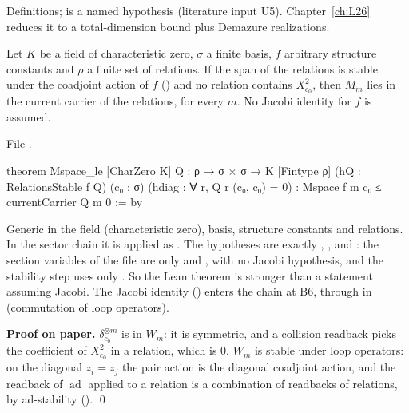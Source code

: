 \begin{status}
Definitions;  is a named hypothesis (literature input U5). Chapter~\ref{ch:L26} reduces it to a
total-dimension bound plus Demazure realizations.
\end{status}

\begin{theorem}[B5: $M_m\subseteq W_m$]\label{l24:thm:B5}
Let $K$ be a field of characteristic zero, $\sigma$ a finite basis, $f$ arbitrary structure constants and $\rho$ a
finite set of relations. If the span of the relations is stable under the coadjoint action of $f$
() and no relation contains $X_{c_0}^2$, then $M_m$ lies in the current carrier of the relations,
for every $m$. No Jacobi identity for $f$ is assumed.
\end{theorem}
\noindent File .
\begin{leancode}
theorem Mspace_le [CharZero K] {Q : ρ → σ × σ → K} [Fintype ρ] (hQ : RelationsStable f Q)
    (c₀ : σ) (hdiag : ∀ r, Q r (c₀, c₀) = 0) : Mspace f m c₀ ≤ currentCarrier Q m 0 := by
\end{leancode}

\begin{dictionary}
Generic in the field (characteristic zero), basis, structure constants and relations. In the sector chain it is
applied as . The hypotheses are exactly \lean{[CharZero K]},
\lean{[Fintype ρ]},  and : the section variables of the file are only
 and , with no Jacobi
hypothesis, and the stability step  uses only . So the Lean theorem is
stronger than a statement assuming Jacobi. The Jacobi identity () enters the chain at B6, through
 in  (commutation of loop operators).
\end{dictionary}

\textbf{Proof on paper.} $\delta_{c_0}^{\otimes m}$ is in $W_m$: it is symmetric, and a collision readback picks the
coefficient of $X_{c_0}^2$ in a relation, which is $0$. $W_m$ is stable under loop operators: on the diagonal
$z_i=z_j$ the pair action is the diagonal coadjoint action, and the readback of $\operatorname{ad}$ applied to a
relation is a combination of readbacks of relations, by ad-stability (). \qed

